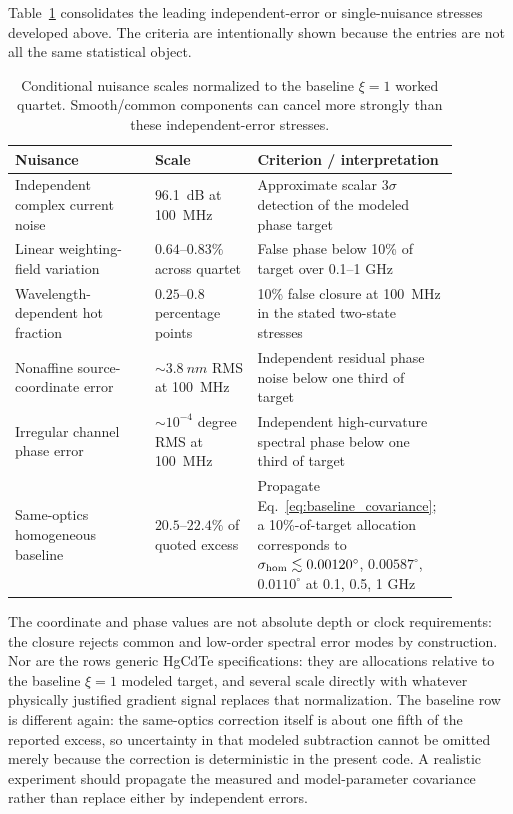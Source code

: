 \documentclass[11pt]{article}
\begin{document}
Table~\ref{tab:nuisance_budget} consolidates the leading independent-error or single-nuisance stresses developed above. The criteria are intentionally shown because the entries are not all the same statistical object.
\begin{table}[H]
\centering
\caption{Conditional nuisance scales normalized to the baseline $\xi=1$ worked quartet. Smooth/common components can cancel more strongly than these independent-error stresses.}
\label{tab:nuisance_budget}
\begin{tabular}{p{0.30\linewidth}p{0.22\linewidth}p{0.36\linewidth}}
\toprule
Nuisance & Scale & Criterion / interpretation \\
\midrule
Independent complex current noise & \SI{96.1}{dB} at \SI{100}{MHz} & Approximate scalar $3\sigma$ detection of the modeled phase target \\
Linear weighting-field variation & $0.64$--$0.83\%$ across quartet & False phase below 10\% of target over 0.1--1 GHz \\
Wavelength-dependent hot fraction & $0.25$--$0.8$ percentage points & 10\% false closure at \SI{100}{MHz} in the stated two-state stresses \\
Nonaffine source-coordinate error & $\sim3.8~\si{nm}$ RMS at \SI{100}{MHz} & Independent residual phase noise below one third of target \\
Irregular channel phase error & $\sim10^{-4}$ degree RMS at \SI{100}{MHz} & Independent high-curvature spectral phase below one third of target \\
Same-optics homogeneous baseline & $20.5$--$22.4\%$ of quoted excess & Propagate Eq.~\eqref{eq:baseline_covariance}; a 10\%-of-target allocation corresponds to $\sigma_{\rm hom}\lesssim0.00120^\circ$, $0.00587^\circ$, $0.0110^\circ$ at 0.1, 0.5, 1 GHz \\
\bottomrule
\end{tabular}
\end{table}
The coordinate and phase values are not absolute depth or clock requirements: the closure rejects common and low-order spectral error modes by construction. Nor are the rows generic HgCdTe specifications: they are allocations relative to the baseline $\xi=1$ modeled target, and several scale directly with whatever physically justified gradient signal replaces that normalization. The baseline row is different again: the same-optics correction itself is about one fifth of the reported excess, so uncertainty in that modeled subtraction cannot be omitted merely because the correction is deterministic in the present code. A realistic experiment should propagate the measured and model-parameter covariance rather than replace either by independent errors.
\end{document}
